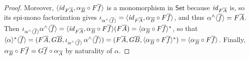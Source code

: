 \documentclass[runningheads]{llncs}
\newcommand{\set}{\mathsf{Set}}
\renewcommand{\id}{\mathit{id}}
\renewcommand{\id}{\mathit{id}}
\begin{document}
\begin{proof}
\vspace*{-0.1in}

\noindent
Moreover, $\langle \id_{F \ol{A}}, \alpha_{\ol{B}} \circ
F\ol{f} \rangle$ is a monomorphism in $\set$ because $\id_{F \ol{A}}$
is, so its epi-mono factorization gives $\iota_{\alpha^\wedge
  \graph{\overline{f}}} = \langle \id_{F \ol{A}}, \alpha_{\ol{B}}
\circ F\ol{f} \rangle$, and thus $\alpha^\wedge \langle {\overline{f}} \rangle =
F\overline{A}$.  Then $\iota_{\alpha^\wedge
  \graph{\overline{f}}} \alpha^\wedge \graph{\overline{f}} = \langle
\id_{F \ol{A}}, \alpha_{\ol{B}} \circ F\ol{f} \rangle (F \ol{A}) =
\graph{ \alpha_{\ol{B}} \circ F\ol{f} }^*$,
so that $\langle { \alpha } \rangle^* \langle { \overline{f} } \rangle = (F\overline{A},
G\overline{B}, \iota_{\alpha^\wedge \langle {\overline{f}} \rangle}\,
\alpha^\wedge \langle {\overline{f}} \rangle) = (F\overline{A}, G\overline{B},
\langle { \alpha_{\overline{B}} \circ F\overline{f} } \rangle^*) = \langle { \alpha_{\overline{B}}
  \circ F\overline{f} } \rangle$.  Finally, $\alpha_{\overline{B}} \circ F\overline{f} = G\overline{f}
\circ \alpha_{\overline{A}}$ by naturality of $\alpha$.
\end{proof}
\end{document}
